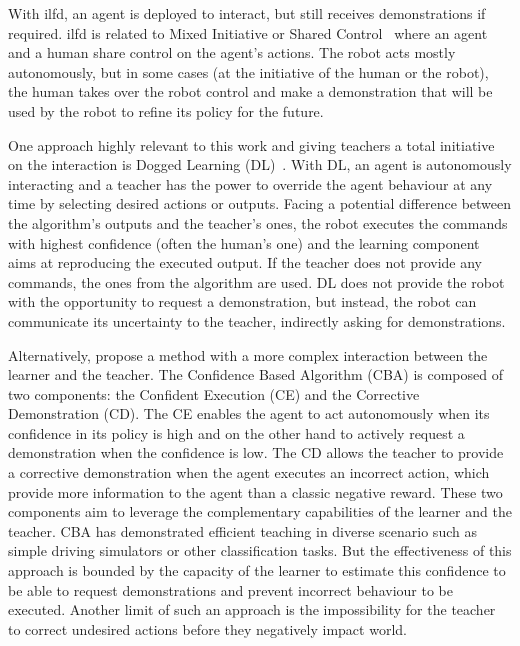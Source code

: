 With \gls{ilfd}, an agent is deployed to interact, but still receives demonstrations if required. \gls{ilfd} is related to Mixed Initiative or Shared Control~\citep{adams2004mixed,kucukyilmaz2018learning} where an agent and a human share control on the agent's actions. The robot acts mostly autonomously, but in some cases (at the initiative of the human or the robot), the human takes over the robot control and make a demonstration that will be used by the robot to refine its policy for the future.

One approach highly relevant to this work and giving teachers a total initiative on the interaction is Dogged Learning (DL)~\citep{grollman2007dogged}. With DL, an agent is autonomously interacting and a teacher has the power to override the agent behaviour at any time by selecting desired actions or outputs. Facing a potential difference between the algorithm's outputs and the teacher's ones, the robot executes the commands with highest confidence (often the human's one) and the learning component aims at reproducing the executed output. If the teacher does not provide any commands, the ones from the algorithm are used. DL does not provide the robot with the opportunity to request a demonstration, but instead, the robot can communicate its uncertainty to the teacher, indirectly asking for demonstrations. 

Alternatively, \cite{chernova2009interactive} propose a method with a more complex interaction between the learner and the teacher. The Confidence Based Algorithm (CBA) is composed of two components: the Confident Execution (CE) and the Corrective Demonstration (CD). The CE enables the agent to act autonomously when its confidence in its policy is high and on the other hand to actively request a demonstration when the confidence is low. The CD allows the teacher to provide a corrective demonstration when the agent executes an incorrect action, which provide more information to the agent than a classic negative reward. These two components aim to leverage the complementary capabilities of the learner and the teacher. CBA has demonstrated efficient teaching in diverse scenario such as simple driving simulators or other classification tasks. But the effectiveness of this approach is bounded by the capacity of the learner to estimate this confidence to be able to request demonstrations and prevent incorrect behaviour to be executed. Another limit of such an approach is the impossibility for the teacher to correct undesired actions before they negatively impact world. 


